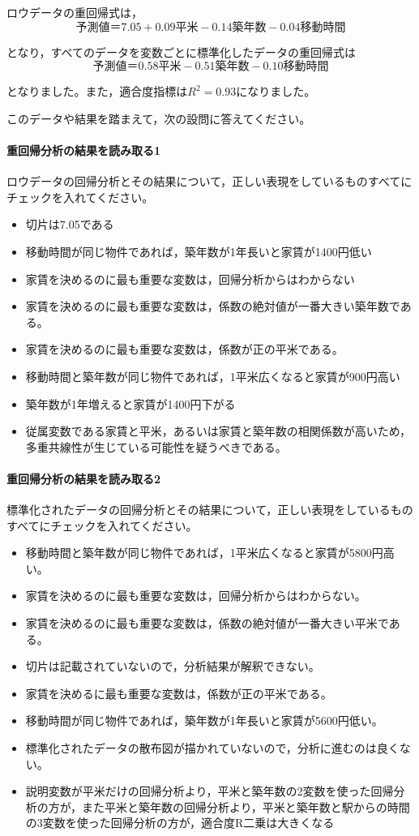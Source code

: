 \documentclass{ltjbook}
\begin{document}
ロウデータの重回帰式は，
\[ \mbox{予測値}　＝　7.05　+　0.09\mbox{平米}　-　0.14\mbox{築年数}　-　0.04\mbox{移動時間} \]

となり，すべてのデータを変数ごとに標準化したデータの重回帰式は
\[ \mbox{予測値}　＝　0.58\mbox{平米}　-　0.51\mbox{築年数}　-　 0.10\mbox{移動時間} \]

となりました。また，適合度指標は$R^2 = 0.93$になりました。

このデータや結果を踏まえて，次の設問に答えてください。

\paragraph{重回帰分析の結果を読み取る1}ロウデータの回帰分析とその結果について，正しい表現をしているものすべてにチェックを入れてください。 
\begin{itemize}
    \item 切片は7.05である
    \item 移動時間が同じ物件であれば，築年数が1年長いと家賃が1400円低い
    \item 家賃を決めるのに最も重要な変数は，回帰分析からはわからない
    \item 家賃を決めるのに最も重要な変数は，係数の絶対値が一番大きい築年数である。
    \item 家賃を決めるのに最も重要な変数は，係数が正の平米である。
    \item 移動時間と築年数が同じ物件であれば，1平米広くなると家賃が900円高い
    \item 築年数が1年増えると家賃が1400円下がる
    \item 従属変数である家賃と平米，あるいは家賃と築年数の相関係数が高いため，多重共線性が生じている可能性を疑うべきである。
\end{itemize}

\paragraph{重回帰分析の結果を読み取る2}標準化されたデータの回帰分析とその結果について，正しい表現をしているものすべてにチェックを入れてください。 
\begin{itemize}
    \item 移動時間と築年数が同じ物件であれば，1平米広くなると家賃が5800円高い。
    \item 家賃を決めるのに最も重要な変数は，回帰分析からはわからない。
    \item 家賃を決めるのに最も重要な変数は，係数の絶対値が一番大きい平米である。
    \item 切片は記載されていないので，分析結果が解釈できない。
    \item 家賃を決めるに最も重要な変数は，係数が正の平米である。
    \item 移動時間が同じ物件であれば，築年数が1年長いと家賃が5600円低い。
    \item 標準化されたデータの散布図が描かれていないので，分析に進むのは良くない。
    \item 説明変数が平米だけの回帰分析より，平米と築年数の2変数を使った回帰分析の方が，また平米と築年数の回帰分析より，平米と築年数と駅からの時間の3変数を使った回帰分析の方が，適合度R二乗は大きくなる 
\end{itemize}
\end{document}
